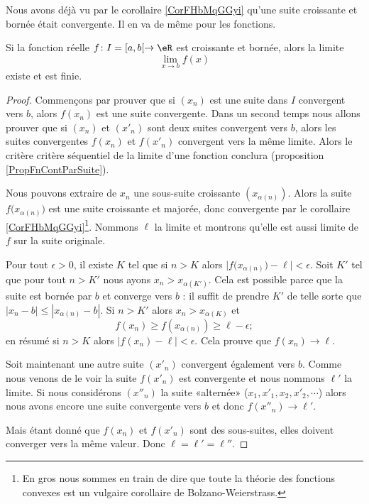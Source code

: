 Nous avons déjà vu par le corollaire \ref{CorFHbMqGGyi} qu'une suite croissante et bornée était convergente. Il en va de même pour les fonctions.
\begin{proposition} \label{PropMTmBYeU}
    Si la fonction réelle \( f\colon I=\mathopen[ a , b [\to \eR\) est croissante et bornée, alors la limite
    \begin{equation}
        \lim_{x\to b} f(x)
    \end{equation}
    existe et est finie.
\end{proposition}

\begin{proof}

    Commençons par prouver que si \( (x_n)\) est une suite dans \( I\) convergent vers \( b\), alors \( f(x_n)\) est une suite convergente. Dans un second temps nous allons prouver que si \( (x_n)\) et \( (x'_n)\) sont deux suites convergent vers \( b\), alors les suites convergentes \( f(x_n)\) et \( f(x'_n)\) convergent vers la même limite. Alors le critère critère séquentiel de la limite d'une fonction conclura (proposition \ref{PropFnContParSuite}).

    Nous pouvons extraire de \( x_n\) une sous-suite croissante \( (x_{\alpha(n)})\). Alors la suite \( f\big( x_{\alpha(n)} \big)\) est une suite croissante et majorée, donc convergente par le corollaire \ref{CorFHbMqGGyi}\footnote{En gros nous sommes en train de dire que toute la théorie des fonctions convexes est un vulgaire corollaire de Bolzano-Weierstrass.}. Nommons \( \ell\) la limite et montrons qu'elle est aussi limite de \( f\) sur la suite originale.

    Pour tout \( \epsilon>0\), il existe \( K\) tel que si \( n>K\) alors \( \big| f\big( x_{\alpha(n)} \big)-\ell \big|<\epsilon\). Soit \( K'\) tel que pour tout \( n>K'\) nous ayons \( x_n>x_{\alpha(K')}\). Cela est possible parce que la suite est bornée par \( b\) et converge vers \( b\) : il suffit de prendre \( K'\) de telle sorte que \( | x_n-b |\leq | x_{\alpha(n)}-b |\). Si \( n>K'\) alors \( x_n>x_{\alpha(K)}\) et
    \begin{equation}
        f(x_n)\geq f(x_{\alpha(n)})\geq \ell-\epsilon;
    \end{equation}
    en résumé si \( n>K\) alors \( | f(x_n)-\ell |<\epsilon\). Cela prouve que \( f(x_n)\to\ell\).

    Soit maintenant une autre suite \( (x'_n)\) convergent également vers \( b\). Comme nous venons de le voir la suite \( f(x'_n)\) est convergente et nous nommons \( \ell'\) la limite. Si nous considérons \( (x''_n)\) la suite «alternée» (\( x_1,x'_1,x_2,x'_2,\cdots\)) alors nous avons encore une suite convergente vers \( b\) et donc \( f(x''_n)\to \ell'\).

    Mais étant donné que \( f(x_n)\) et \( f(x'_n)\) sont des sous-suites, elles doivent converger vers la même valeur. Donc \( \ell=\ell'=\ell''\).
\end{proof}

